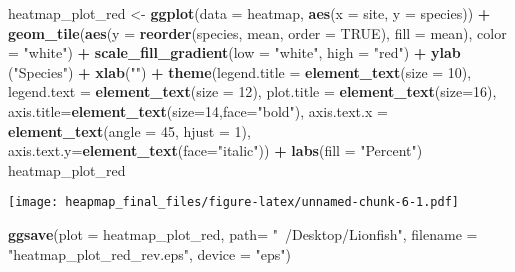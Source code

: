 \documentclass[]{article}
\newenvironment{Shaded}{\begin{snugshade}}{\end{snugshade}}
\newcommand{\KeywordTok}[1]{\textcolor[rgb]{0.13,0.29,0.53}{\textbf{#1}}}
\newcommand{\DataTypeTok}[1]{\textcolor[rgb]{0.13,0.29,0.53}{#1}}
\newcommand{\DecValTok}[1]{\textcolor[rgb]{0.00,0.00,0.81}{#1}}
\newcommand{\StringTok}[1]{\textcolor[rgb]{0.31,0.60,0.02}{#1}}
\newcommand{\OtherTok}[1]{\textcolor[rgb]{0.56,0.35,0.01}{#1}}
\newcommand{\OperatorTok}[1]{\textcolor[rgb]{0.81,0.36,0.00}{\textbf{#1}}}
\newcommand{\NormalTok}[1]{#1}
\begin{document}
\begin{Shaded}
\begin{Highlighting}[]
\NormalTok{heatmap_plot_red <-}\StringTok{ }\KeywordTok{ggplot}\NormalTok{(}\DataTypeTok{data =}\NormalTok{ heatmap, }\KeywordTok{aes}\NormalTok{(}\DataTypeTok{x =}\NormalTok{ site, }\DataTypeTok{y =}\NormalTok{ species)) }\OperatorTok{+}\StringTok{ }\KeywordTok{geom_tile}\NormalTok{(}\KeywordTok{aes}\NormalTok{(}\DataTypeTok{y =} \KeywordTok{reorder}\NormalTok{(species, mean, }\DataTypeTok{order =} \OtherTok{TRUE}\NormalTok{), }\DataTypeTok{fill =}\NormalTok{ mean), }\DataTypeTok{color =} \StringTok{"white"}\NormalTok{) }\OperatorTok{+}
\StringTok{  }\KeywordTok{scale_fill_gradient}\NormalTok{(}\DataTypeTok{low =} \StringTok{"white"}\NormalTok{, }\DataTypeTok{high =} \StringTok{"red"}\NormalTok{) }\OperatorTok{+}
\StringTok{  }\KeywordTok{ylab}\NormalTok{ (}\StringTok{"Species"}\NormalTok{) }\OperatorTok{+}
\StringTok{  }\KeywordTok{xlab}\NormalTok{(}\StringTok{""}\NormalTok{) }\OperatorTok{+}\StringTok{  }
\StringTok{  }\KeywordTok{theme}\NormalTok{(}\DataTypeTok{legend.title =} \KeywordTok{element_text}\NormalTok{(}\DataTypeTok{size =} \DecValTok{10}\NormalTok{),}
        \DataTypeTok{legend.text =} \KeywordTok{element_text}\NormalTok{(}\DataTypeTok{size =} \DecValTok{12}\NormalTok{),}
        \DataTypeTok{plot.title =} \KeywordTok{element_text}\NormalTok{(}\DataTypeTok{size=}\DecValTok{16}\NormalTok{),}
        \DataTypeTok{axis.title=}\KeywordTok{element_text}\NormalTok{(}\DataTypeTok{size=}\DecValTok{14}\NormalTok{,}\DataTypeTok{face=}\StringTok{"bold"}\NormalTok{),}
        \DataTypeTok{axis.text.x =} \KeywordTok{element_text}\NormalTok{(}\DataTypeTok{angle =} \DecValTok{45}\NormalTok{, }\DataTypeTok{hjust =} \DecValTok{1}\NormalTok{),}
\DataTypeTok{axis.text.y=}\KeywordTok{element_text}\NormalTok{(}\DataTypeTok{face=}\StringTok{"italic"}\NormalTok{)) }\OperatorTok{+}
\StringTok{  }\KeywordTok{labs}\NormalTok{(}\DataTypeTok{fill =} \StringTok{"Percent"}\NormalTok{)}
\NormalTok{heatmap_plot_red}
\end{Highlighting}
\end{Shaded}

\texttt{[image: heapmap\_final\_files/figure-latex/unnamed-chunk-6-1.pdf]}

\begin{Shaded}
\begin{Highlighting}[]
\KeywordTok{ggsave}\NormalTok{(}\DataTypeTok{plot =}\NormalTok{ heatmap_plot_red, }\DataTypeTok{path=} \StringTok{"~/Desktop/Lionfish"}\NormalTok{, }\DataTypeTok{filename =} \StringTok{"heatmap_plot_red_rev.eps"}\NormalTok{, }\DataTypeTok{device =} \StringTok{"eps"}\NormalTok{)}
\end{Highlighting}
\end{Shaded}
\end{document}
